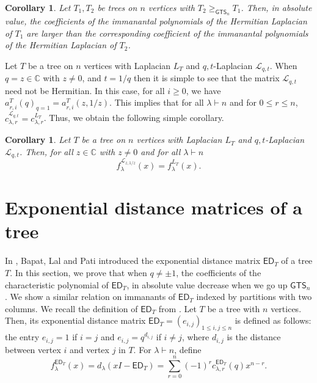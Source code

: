 \documentclass[12pt]{article}
\newtheorem{corollary}[theorem]{Corollary}
\newcommand{\ED}{ \mathsf{ED}}
\newcommand{\sL}{  \mathcal{ L}}
\newcommand{\red}[1]{\textcolor{red}{#1}}
\newcommand{\CC}{ \mathbb{C}}
\newcommand{\GTS}{\mathsf{GTS}}
\begin{document}
\begin{corollary}
  Let $T_1, T_2$ be trees on $n$ vertices with $T_2 \geq_{\GTS_n} T_1$. 
Then, in absolute value, the coefficients of the immanantal polynomials 
of the Hermitian Laplacian of $T_1$ are larger than the 
corresponding coefficient of the immanantal polynomials of
the Hermitian Laplacian of $T_2$. 
\end{corollary}

Let $T$ be a tree on $n$ vertices 
with Laplacian $L_T$ and $q,t$-Laplacian $\sL_{q,t}$.
When $q=z\in \CC$ with $z\neq 0$, and $t=1/q$ 
then it is simple to see  that the matrix $\sL_{q,t}$ need not be Hermitian. 
In this case, for all $i\geq 0$, we have $a_{r,i}^T(q)_{q=1}^{}=a_{r,i}^T(z,1/z)$. 
This implies that  
for all $\lambda \vdash n$ and for $0\leq r \leq n$,
$c_{\lambda,r}^{\sL_{q,t}}=c_{\lambda,r}^{L_{T}}$.
Thus, we obtain the following  simple corollary.  
\begin{corollary}
Let $T$ be a tree on $n$ vertices with Laplacian $L_T$ and $q,t$-Laplacian  $\sL_{q,t}$.
Then, for all  $z\in \CC$ with $z\neq 0$ and for all $\lambda \vdash n$
$$f_{\lambda}^{\sL_{z,1/z}}(x)=f_{\lambda}^{L_T}(x).$$
\end{corollary}

\section{Exponential distance matrices of a tree} 
\label{sec:expon_dist_mat}

In \cite{bapat-lal-pati}, Bapat, Lal and Pati introduced the 
exponential distance matrix $\ED_T$ of a tree $T$.
In this section, we prove that when $q \not= \pm 1$, 
the coefficients
of the characteristic polynomial of $\ED_T$, in absolute 
value decrease when we go up $\GTS_n$.  
We show a similar relation on immanants of $\ED_T$ indexed
by partitions with two columns.
We recall the definition of $\ED_T$ from \cite{bapat-lal-pati}.
Let $T$ be a tree with $n$ vertices.    
Then, its exponential distance matrix 
$\ED_T=(e_{i,j})_{1\leq i,j\leq n}$ is defined as follows: 
  the entry $e_{i,j}=1$ if $i=j$ and $e_{i,j}=q^{d_{i,j}}$ if $i\neq j$, 
  where $d_{i,j}$ is the distance between vertex $i$ and vertex $j$ in $T$.  
For $\lambda\vdash n$, define 
\begin{equation}
\label{eq:def_char_poly_ED}
f_{\lambda}^{\ED_{T}}(x) = d_{\lambda}(xI -\ED_{T}) = \sum_{r=0}^n (-1)^r c_{\lambda,r}^{\ED_{T}}(q) x^{n-r}.
\end{equation}
\end{document}
